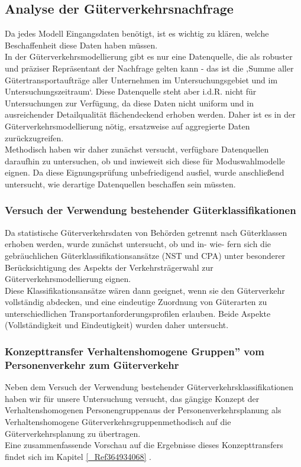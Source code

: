 % 
\subsection{Analyse der Güterverkehrsnachfrage}
\label{_Ref361847188}
\label{_Toc363572027}
\label{_Toc363601740}
\label{_Toc365801601}
\label{_Toc366766100}
\label{_Toc366775294}
Da jedes Modell Eingangsdaten benötigt, ist es wichtig zu klären, welche Beschaffenheit diese Daten haben müssen.~\\
In der Güterverkehrsmodellierung gibt es nur eine Datenquelle, die als robuster und präziser Repräsentant der Nachfrage gelten kann - das ist die ‚Summe aller Gütertransportaufträge aller Unternehmen im Untersuchungsgebiet und im Untersuchungszeitraum‘. Diese Datenquelle steht aber i.d.R. nicht für Untersuchungen zur Verfügung, da diese Daten nicht uniform und in ausreichender Detailqualität flächendeckend erhoben werden. Daher ist es in der Güterverkehrsmodellierung nötig, ersatzweise auf aggregierte Daten zurückzugreifen.~\\
Methodisch haben wir daher zunächst versucht, verfügbare Datenquellen daraufhin zu untersuchen, ob und inwieweit sich diese für Moduswahlmodelle eignen. Da diese Eignungsprüfung unbefriedigend ausfiel, wurde anschließend untersucht, wie derartige Datenquellen beschaffen sein müssten.~\\


% 
\subsubsection{Versuch der Verwendung bestehender Güterklassifikationen}
\label{_Toc366766101}
\label{_Toc366775295}
Da statistische Güterverkehrsdaten von Behörden getrennt nach Güterklassen erhoben werden, wurde zunächst untersucht, ob und in- wie- fern sich die gebräuchlichen Güterklassifikationsansätze (NST und CPA) unter besonderer Berücksichtigung des Aspekts der Verkehrsträgerwahl zur Güterverkehrsmodellierung eignen.~\\
Diese Klassifikationsansätze wären dann geeignet, wenn sie den Güterverkehr vollständig abdecken, und eine eindeutige Zuordnung von Güterarten zu unterschiedlichen Transportanforderungsprofilen erlauben. Beide Aspekte (Vollständigkeit und Eindeutigkeit) wurden daher untersucht.~\\


% 
\subsubsection{Konzepttransfer \grqq Verhaltenshomogene Gruppen” vom Personenverkehr zum Güterverkehr}
\label{_Toc366766102}
\label{_Toc366775296}
Neben dem Versuch der Verwendung bestehender Güterverkehrsklassifikationen haben wir für unsere Untersuchung versucht, das gängige Konzept der \glqq Verhaltenshomogenen Personengruppen\grqq  aus der Personenverkehrsplanung als \glqq Verhaltenshomogene Güterverkehrsgruppen\grqq  methodisch auf die Güterverkehrsplanung zu übertragen.~\\
Eine zusammenfassende Vorschau auf die Ergebnisse dieses Konzepttransfers findet sich im Kapitel \autoref{_Ref364934068} .~\\


